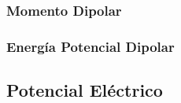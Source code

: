\documentclass[10pt,letterpaper]{article}
\begin{document}
\begin{multicols}{2}
\subsubsection{Momento Dipolar}
\columnbreak
\subsubsection{Energía Potencial Dipolar}
\end{multicols}
\subsection{Potencial Eléctrico}
\end{document}

